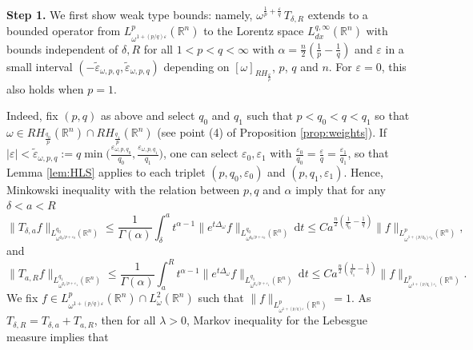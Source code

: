 \documentclass[12pt, letterpaper]{amsart}
\theoremstyle{definition}
\theoremstyle{remark}
\numberwithin{equation}{section}
\begin{document}
    \bigskip

     \noindent\textbf{Step 1.} We first show weak type bounds:  namely,  
     $\omega^{\frac{1}{p}+\frac{\varepsilon}{q}} \, T_{\delta,R}$  extends to a bounded operator from $L^p_{\omega^{1+(p/q)\varepsilon}}(\mathbb{R}^n)$ to the Lorentz space $L^{q,\infty}_{dx}(\mathbb{R}^n)$ with bounds independent of $\delta, R$ for all $1<p<q<\infty$ with $\alpha=\frac{n}{2}(\frac{1}{p}-\frac{1}{q})$ and $\varepsilon$ in a small interval $(-\tilde{\varepsilon}_{\omega, p,q},\tilde{\varepsilon}_{\omega, p,q})$ depending on $[ \omega  ]_{RH_{\frac{q}{p}}}$, $p$, $q$ and $n$. For $\varepsilon=0$, this also holds when $p=1$.
    
    Indeed, fix $(p,q)$ as above and  select $q_0$ and $q_1$ such that
      $p<q_0<q<q_1$  so that
       $\omega \in RH_{\frac{q_0}{p}}(\mathbb{R}^n)\cap RH_{\frac{q_1}{p}}(\mathbb{R}^n)$ (see point (4) of Proposition \ref{prop:weights}). If $|\varepsilon| < \tilde{\varepsilon}_{\omega, p,q}:= q \min \big(\frac{\varepsilon_{\omega, p,q_0}}{q_0},  \frac{\varepsilon_{\omega, p,q_1}}{q_1}\big)$, one can select  $\varepsilon_0, \varepsilon_1$ with $\frac{\varepsilon_0}{q_0}=\frac{\varepsilon}{q}=\frac{\varepsilon_1}{q_1}$,  so that  Lemma \ref{lem:HLS} applies to each triplet $(p,q_0, \varepsilon_0)$ and $(p,q_1, \varepsilon_1)$.   Hence,  Minkowski inequality with the relation between $p,q$ and $\alpha$ imply that for  any $\delta <a<R    $
\begin{equation*}
      \| T_{\delta,a}f\|_{L^{q_0}_{\omega^{q_0/p+\varepsilon_0}}(\mathbb{R}^n)} \le \frac{1}{\Gamma(\alpha)}   \int_{\delta }^{a} t^{\alpha -1} \|e^{t\Delta_\omega}f\|_{L^{q_0}_{\omega^{q_0/p+\varepsilon_0}}(\mathbb{R}^n)} \, \mathrm dt  \leq C a^{\frac{n}{2}(\frac{1}{q_0}-\frac{1}{q})} 
      \|  f \|_{L^p_{\omega^{1+(p/q_0)\varepsilon_0}}(\mathbb{R}^n)},
    \end{equation*}
    and 
    \begin{equation*}
       \| T_{a,R}f\|_{L^{q_1}_{\omega^{q_1/p+{ \varepsilon_1}}}(\mathbb{R}^n)} \le \frac{1}{\Gamma(\alpha)}  \int_{a}^{R} t^{\alpha -1} \|e^{t\Delta_\omega}f\|_{L^{q_1}_{\omega^{q_1/p+{\varepsilon_1}}}(\mathbb{R}^n)} \, \mathrm dt  \leq C a^{\frac{n}{2}(\frac{1}{q_1}-\frac{1}{q})} 
       \|  f \|_{L^p_{\omega^{1+(p/q_1){\varepsilon_1}}}(\mathbb{R}^n)}.
    \end{equation*}
     We fix $f\in L^p_{\omega^{1+(p/q)\varepsilon}}(\mathbb{R}^n) \cap L^2_\omega(\mathbb{R}^n)$ such that $\|  f \|_{L^p_{\omega^{1+(p/q)\varepsilon}}(\mathbb{R}^n)}=1$. As $T_{\delta,R}=T_{\delta,a}+T_{a,R}$, then for all $\lambda>0$, Markov inequality for the Lebesgue measure implies that
\end{document}

